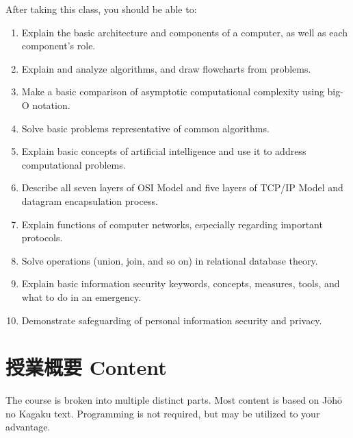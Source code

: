 \documentclass{article}
\begin{document}
After taking this class, you should be able to:
\begin{enumerate}
	\item Explain the basic architecture and components of a computer, as well as each component's role.
	\item Explain and analyze algorithms, and draw flowcharts from problems.
	\item Make a basic comparison of asymptotic computational complexity using big-O notation.
	\item Solve basic problems representative of common algorithms.
	\item Explain basic concepts of artificial intelligence and use it to address computational problems.
	\item Describe all seven layers of OSI Model and five layers of TCP/IP Model and datagram encapsulation process.
	\item Explain functions of computer networks, especially regarding important protocols.
	\item Solve operations (union, join, and so on) in relational database theory.
	\item Explain basic information security keywords, concepts, measures, tools, and what to do in an emergency.
	\item Demonstrate safeguarding of personal information security and privacy.
\end{enumerate}

\section{授業概要 Content}
The course is broken into multiple distinct parts. Most content is based on J\={o}h\={o} no Kagaku text. Programming is not required, but may be utilized to your advantage.
\end{document}
